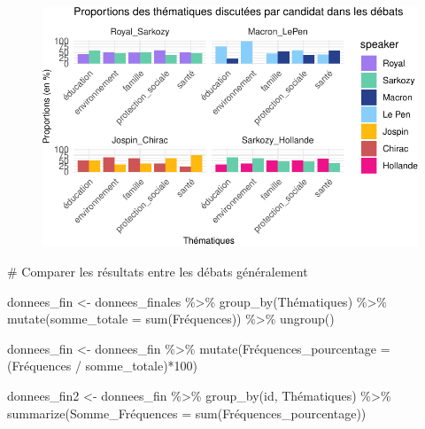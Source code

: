 \documentclass[
  letterpaper,
  DIV=11,
  numbers=noendperiod]{scrartcl}
\newenvironment{Shaded}{\begin{snugshade}}{\end{snugshade}}
\newcommand{\AttributeTok}[1]{\textcolor[rgb]{0.40,0.45,0.13}{#1}}
\newcommand{\CommentTok}[1]{\textcolor[rgb]{0.37,0.37,0.37}{#1}}
\newcommand{\DecValTok}[1]{\textcolor[rgb]{0.68,0.00,0.00}{#1}}
\newcommand{\FunctionTok}[1]{\textcolor[rgb]{0.28,0.35,0.67}{#1}}
\newcommand{\NormalTok}[1]{\textcolor[rgb]{0.00,0.23,0.31}{#1}}
\newcommand{\OtherTok}[1]{\textcolor[rgb]{0.00,0.23,0.31}{#1}}
\newcommand{\SpecialCharTok}[1]{\textcolor[rgb]{0.37,0.37,0.37}{#1}}
\begin{document}
\begin{figure}[H]

{\centering \includegraphics{Travail-Session_files/figure-pdf/unnamed-chunk-2-5.pdf}

}

\end{figure}

\begin{Shaded}
\begin{Highlighting}[]
\CommentTok{\# Comparer les résultats entre les débats généralement}

\NormalTok{donnees\_fin }\OtherTok{\textless{}{-}}\NormalTok{ donnees\_finales }\SpecialCharTok{\%\textgreater{}\%} \FunctionTok{group\_by}\NormalTok{(Thématiques) }\SpecialCharTok{\%\textgreater{}\%} \FunctionTok{mutate}\NormalTok{(}\AttributeTok{somme\_totale =} \FunctionTok{sum}\NormalTok{(Fréquences)) }\SpecialCharTok{\%\textgreater{}\%} \FunctionTok{ungroup}\NormalTok{()}

\NormalTok{donnees\_fin }\OtherTok{\textless{}{-}}\NormalTok{ donnees\_fin }\SpecialCharTok{\%\textgreater{}\%} \FunctionTok{mutate}\NormalTok{(Fréquences}\AttributeTok{\_pourcentage =}\NormalTok{ (Fréquences }\SpecialCharTok{/}\NormalTok{ somme\_totale)}\SpecialCharTok{*}\DecValTok{100}\NormalTok{)}

\NormalTok{donnees\_fin2 }\OtherTok{\textless{}{-}}\NormalTok{ donnees\_fin }\SpecialCharTok{\%\textgreater{}\%} \FunctionTok{group\_by}\NormalTok{(id, Thématiques) }\SpecialCharTok{\%\textgreater{}\%} \FunctionTok{summarize}\NormalTok{(Somme\_Fréquences }\OtherTok{=} \FunctionTok{sum}\NormalTok{(Fréquences\_pourcentage))}
\end{Highlighting}
\end{Shaded}
\end{document}
